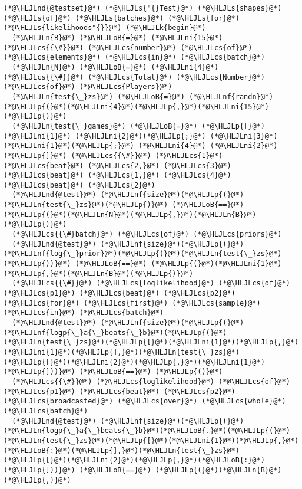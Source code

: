 \documentclass[12pt,a4paper]{article}
\newcommand{\HLJLk}[1]{\textcolor[RGB]{148,91,176}{\textbf{#1}}}
\newcommand{\HLJLn}[1]{#1}
\newcommand{\HLJLnd}[1]{\textcolor[RGB]{214,102,97}{#1}}
\newcommand{\HLJLnf}[1]{\textcolor[RGB]{66,102,213}{#1}}
\newcommand{\HLJLs}[1]{\textcolor[RGB]{201,61,57}{#1}}
\newcommand{\HLJLni}[1]{\textcolor[RGB]{59,151,46}{#1}}
\newcommand{\HLJLoB}[1]{\textcolor[RGB]{102,102,102}{\textbf{#1}}}
\newcommand{\HLJLp}[1]{#1}
\newcommand{\HLJLcs}[1]{\textcolor[RGB]{153,153,119}{\textit{#1}}}
\begin{document}
\begin{lstlisting}
(*@\HLJLnd{@testset}@*) (*@\HLJLs{"{}Test}@*) (*@\HLJLs{shapes}@*) (*@\HLJLs{of}@*) (*@\HLJLs{batches}@*) (*@\HLJLs{for}@*) (*@\HLJLs{likelihoods"{}}@*) (*@\HLJLk{begin}@*)
  (*@\HLJLn{B}@*) (*@\HLJLoB{=}@*) (*@\HLJLni{15}@*) (*@\HLJLcs{{\#}}@*) (*@\HLJLcs{number}@*) (*@\HLJLcs{of}@*) (*@\HLJLcs{elements}@*) (*@\HLJLcs{in}@*) (*@\HLJLcs{batch}@*)
  (*@\HLJLn{N}@*) (*@\HLJLoB{=}@*) (*@\HLJLni{4}@*) (*@\HLJLcs{{\#}}@*) (*@\HLJLcs{Total}@*) (*@\HLJLcs{Number}@*) (*@\HLJLcs{of}@*) (*@\HLJLcs{Players}@*)
  (*@\HLJLn{test{\_}zs}@*) (*@\HLJLoB{=}@*) (*@\HLJLnf{randn}@*)(*@\HLJLp{(}@*)(*@\HLJLni{4}@*)(*@\HLJLp{,}@*)(*@\HLJLni{15}@*)(*@\HLJLp{)}@*)
  (*@\HLJLn{test{\_}games}@*) (*@\HLJLoB{=}@*) (*@\HLJLp{[}@*)(*@\HLJLni{1}@*) (*@\HLJLni{2}@*)(*@\HLJLp{;}@*) (*@\HLJLni{3}@*) (*@\HLJLni{1}@*)(*@\HLJLp{;}@*) (*@\HLJLni{4}@*) (*@\HLJLni{2}@*)(*@\HLJLp{]}@*) (*@\HLJLcs{{\#}}@*) (*@\HLJLcs{1}@*) (*@\HLJLcs{beat}@*) (*@\HLJLcs{2,}@*) (*@\HLJLcs{3}@*) (*@\HLJLcs{beat}@*) (*@\HLJLcs{1,}@*) (*@\HLJLcs{4}@*) (*@\HLJLcs{beat}@*) (*@\HLJLcs{2}@*)
  (*@\HLJLnd{@test}@*) (*@\HLJLnf{size}@*)(*@\HLJLp{(}@*)(*@\HLJLn{test{\_}zs}@*)(*@\HLJLp{)}@*) (*@\HLJLoB{==}@*) (*@\HLJLp{(}@*)(*@\HLJLn{N}@*)(*@\HLJLp{,}@*)(*@\HLJLn{B}@*)(*@\HLJLp{)}@*)
  (*@\HLJLcs{{\#}batch}@*) (*@\HLJLcs{of}@*) (*@\HLJLcs{priors}@*)
  (*@\HLJLnd{@test}@*) (*@\HLJLnf{size}@*)(*@\HLJLp{(}@*)(*@\HLJLnf{log{\_}prior}@*)(*@\HLJLp{(}@*)(*@\HLJLn{test{\_}zs}@*)(*@\HLJLp{))}@*) (*@\HLJLoB{==}@*) (*@\HLJLp{(}@*)(*@\HLJLni{1}@*)(*@\HLJLp{,}@*)(*@\HLJLn{B}@*)(*@\HLJLp{)}@*)
  (*@\HLJLcs{{\#}}@*) (*@\HLJLcs{loglikelihood}@*) (*@\HLJLcs{of}@*) (*@\HLJLcs{p1}@*) (*@\HLJLcs{beat}@*) (*@\HLJLcs{p2}@*) (*@\HLJLcs{for}@*) (*@\HLJLcs{first}@*) (*@\HLJLcs{sample}@*) (*@\HLJLcs{in}@*) (*@\HLJLcs{batch}@*)
  (*@\HLJLnd{@test}@*) (*@\HLJLnf{size}@*)(*@\HLJLp{(}@*)(*@\HLJLnf{logp{\_}a{\_}beats{\_}b}@*)(*@\HLJLp{(}@*)(*@\HLJLn{test{\_}zs}@*)(*@\HLJLp{[}@*)(*@\HLJLni{1}@*)(*@\HLJLp{,}@*)(*@\HLJLni{1}@*)(*@\HLJLp{],}@*)(*@\HLJLn{test{\_}zs}@*)(*@\HLJLp{[}@*)(*@\HLJLni{2}@*)(*@\HLJLp{,}@*)(*@\HLJLni{1}@*)(*@\HLJLp{]))}@*) (*@\HLJLoB{==}@*) (*@\HLJLp{()}@*)
  (*@\HLJLcs{{\#}}@*) (*@\HLJLcs{loglikelihood}@*) (*@\HLJLcs{of}@*) (*@\HLJLcs{p1}@*) (*@\HLJLcs{beat}@*) (*@\HLJLcs{p2}@*) (*@\HLJLcs{broadcasted}@*) (*@\HLJLcs{over}@*) (*@\HLJLcs{whole}@*) (*@\HLJLcs{batch}@*)
  (*@\HLJLnd{@test}@*) (*@\HLJLnf{size}@*)(*@\HLJLp{(}@*)(*@\HLJLn{logp{\_}a{\_}beats{\_}b}@*)(*@\HLJLoB{.}@*)(*@\HLJLp{(}@*)(*@\HLJLn{test{\_}zs}@*)(*@\HLJLp{[}@*)(*@\HLJLni{1}@*)(*@\HLJLp{,}@*)(*@\HLJLoB{:}@*)(*@\HLJLp{],}@*)(*@\HLJLn{test{\_}zs}@*)(*@\HLJLp{[}@*)(*@\HLJLni{2}@*)(*@\HLJLp{,}@*)(*@\HLJLoB{:}@*)(*@\HLJLp{]))}@*) (*@\HLJLoB{==}@*) (*@\HLJLp{(}@*)(*@\HLJLn{B}@*)(*@\HLJLp{,)}@*)

\end{lstlisting}
\end{document}
